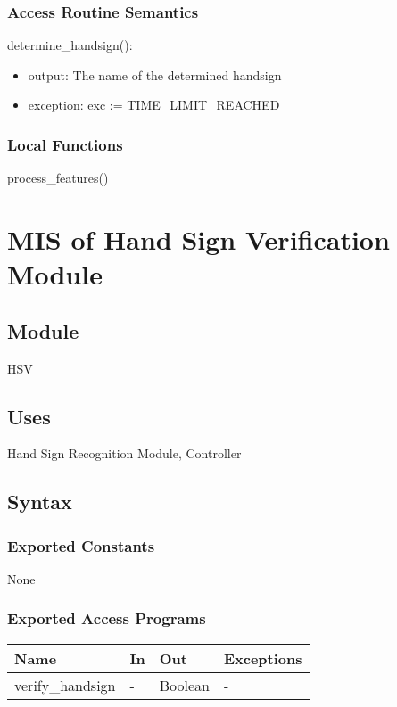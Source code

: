 \documentclass[12pt, titlepage]{article}
\begin{document}
\subsubsection{Access Routine Semantics}
\noindent determine\_handsign():
\begin{itemize}
\item output: The name of the determined handsign
\item exception: exc := TIME\_LIMIT\_REACHED
\end{itemize}
\subsubsection{Local Functions}
process\_features()

\newpage

\section{MIS of Hand Sign Verification Module} \label{Module} 
\subsection{Module}
HSV
\subsection{Uses}
Hand Sign Recognition Module, Controller
\subsection{Syntax}
 \subsubsection{Exported Constants}
None
\subsubsection{Exported Access Programs}
\begin{center}
\begin{tabular}{p{4cm} p{4cm} p{4cm} p{2cm}}
\hline
\textbf{Name} & \textbf{In} & \textbf{Out} & \textbf{Exceptions} \\
\hline
verify\_handsign & - & Boolean & - \\
\hline
\end{tabular}
\end{center}
\end{document}
